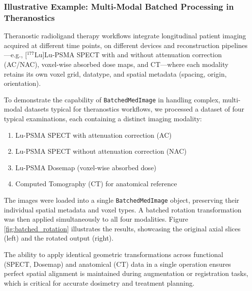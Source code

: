 \documentclass[10pt,letterpaper]{article}
\begin{document}
\subsubsection*{Illustrative Example: Multi-Modal Batched Processing in Theranostics}

Theranostic radioligand therapy workflows integrate longitudinal patient imaging acquired at different time points, on different devices and reconstruction pipelines---e.g., [$^{177}$Lu]Lu-PSMA SPECT with and without attenuation correction (AC/NAC), voxel-wise absorbed dose maps, and CT---where each modality retains its own voxel grid, datatype, and spatial metadata (spacing, origin, orientation).  

To demonstrate the capability of \texttt{BatchedMedImage} in handling complex, multi-modal datasets typical for theranostics workflows, we processed a dataset of four typical examinations, each containing a distinct imaging modality:
\begin{enumerate}
    \item [$^{177}$Lu]Lu-PSMA SPECT with attenuation correction (AC)
    \item [$^{177}$Lu]Lu-PSMA SPECT without attenuation correction (NAC)
    \item [$^{177}$Lu]Lu-PSMA Dosemap (voxel-wise absorbed dose)
    \item Computed Tomography (CT) for anatomical reference
\end{enumerate}

The images were loaded into a single \texttt{BatchedMedImage} object, preserving their individual spatial metadata and voxel types. A batched rotation transformation was then applied simultaneously to all four modalities. Figure \ref{fig:batched_rotation} illustrates the results, showcasing the original axial slices (left) and the rotated output (right). 

The ability to apply identical geometric transformations across functional (SPECT, Dosemap) and anatomical (CT) data in a single operation ensures perfect spatial alignment is maintained during augmentation or registration tasks, which is critical for accurate dosimetry and treatment planning.
\end{document}
